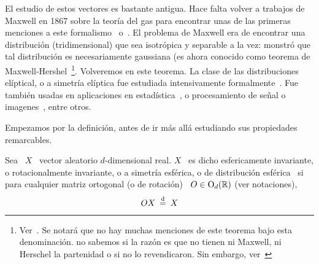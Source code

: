
\label{Ssec:MP:FamiliaEliptica}



\label{Ssec:MP:FamiliaElipticaReal}


El estudio de  estos vectores es bastante antigua. Hace  falta volver a trabajos
de Maxwell en 1867 sobre la teor\'ia del gas para encontrar unas de las primeras
menciones  a este  formalismo~\cite{Max67}  o~\cite[pp.~377--391]{Nie52:v1}.  El
problema de Maxwell era de encontrar una distribuci\'on (tridimensional) que sea
isotr\'opica  y  separable  a  la  vez:  monstr\'o  que  tal  distribuci\'on  es
necesariamente    gaussiana    (es    ahora    conocido    como    teorema    de
Maxwell-Hershel~\footnote{Ver~\cite[Prop.~4.11]{BilBre99}.   Se notar\'a  que no
  hay muchas menciones  de este teorema bajo esta  denominaci\'on. no sabemos si
  la raz\'on es que  no tienen ni Maxwell, ni Herschel la  partenidad o si no lo
  revendicaron. Sin embargo, ver~\cite{Max67}}.   Volveremos en este teorema. La
clase de las distribuciones el\'iptical, o a simetr\'ia el\'iptica fue estudiada
intensivamente  formalmente~\cite{Bar34,  Bar34:07,  Ver64, McgWag68,  CamHua81,
  Eat81,  Kan94,  Lau75,  Yao73,  KotNad01,  FanKot90,  Mui82,  BilBre99}.   Fue
tambi\'en  usadas   en  aplicaciones  en   estad\'istica~\cite{BlaTho68,  Chu73,
  YanKot03,  ArePin06,  BauPas07,  ChiPas08},   o  procesamiento  de  se\~nal  o
imagenes~\cite{Gol76, RanWei93, RanWei95, ZozVig10, Zoz12}, entre otros.

Empezamos  por  la  definici\'on,  antes  de  ir  m\'as  all\'a  estudiando  sus
propiedades remarcables.

\begin{definicion}
  Sea  \  $X$  \  vector   aleatorio  $d$-dimensional  real.   $X$  \  es  dicho
  esfericamente  invariante,  o   rotacionalmente  invariante,  o  a  simetr\'ia
  esf\'erica,  o  de  distribuci\'on  esf\'erica  \  si  para  cualquier  matriz
  ortogonal (o de rotaci\'on)
  \ $O \in \mathrm{O}_d(\mathbb{R})$ (ver notaciones),
  \[
  O  X  \: \stackrel{\mathrm{d}}{=}  \: X
  \]
\end{definicion}

